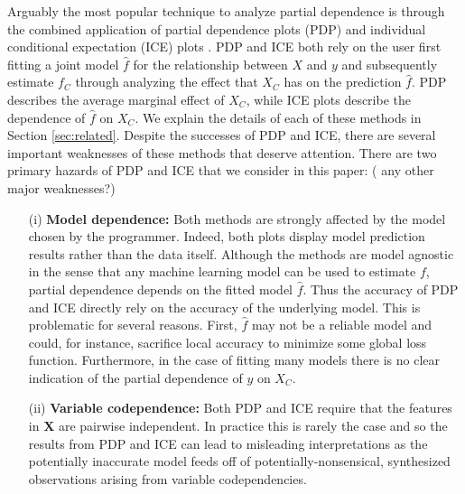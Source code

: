 \documentclass[12pt]{article}
\begin{document}
Arguably the most popular technique to analyze partial dependence is through the combined application of partial dependence plots (PDP) \citep{PDP} and individual conditional expectation (ICE) plots \citep{ICE}. PDP and ICE both rely on the user first fitting a joint model $\widehat{f}$ for the relationship between $X$ and $y$ and subsequently estimate $f_C$ through analyzing the effect that $X_C$ has on the prediction $\widehat{f}$. PDP describes the average marginal effect of $X_C$, while ICE plots describe the dependence of $\widehat{f}$ on $X_C$. We explain the details of each of these methods in Section \ref{sec:related}. Despite the successes of PDP and ICE, there are several important weaknesses of these methods that deserve attention. There are two primary hazards of PDP and ICE that we consider in this paper: ({\color{red} any other major weaknesses?})
\begin{itemize}
	\item[(i)] {\bf Model dependence:} Both methods are strongly affected by the model chosen by the programmer. Indeed, both plots display model prediction results rather than the data itself. Although the methods are model agnostic in the sense that any machine learning model can be used to estimate $f$, partial dependence depends on the fitted model $\widehat{f}$. Thus the accuracy of PDP and ICE directly rely on the accuracy of the underlying model. This is problematic for several reasons. First, $\widehat{f}$ may not be a reliable model and could, for instance, sacrifice local accuracy to minimize some global loss function. Furthermore, in the case of fitting many models there is no clear indication of the partial dependence of $y$ on $X_C$.
	\item[(ii)] {\bf Variable codependence:} Both PDP and ICE require that the features in $\mathbf{X}$ are pairwise independent. In practice this is rarely the case and so the results from PDP and ICE can lead to misleading interpretations as the potentially inaccurate model feeds off of potentially-nonsensical, synthesized observations arising from variable codependencies.  
\end{itemize}
\end{document}
